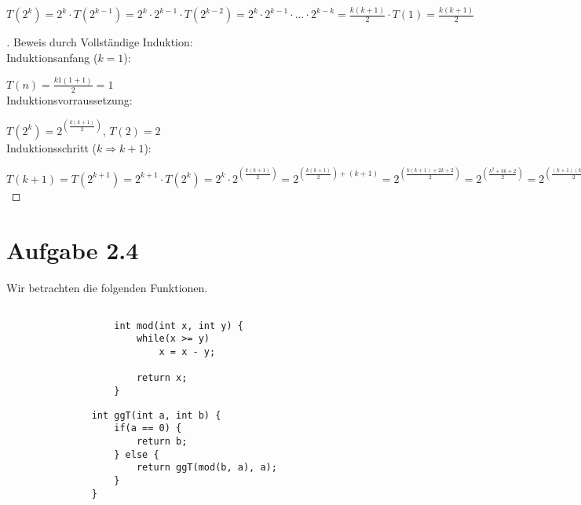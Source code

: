 \documentclass[a4paper]{article}
\begin{document}
$T\left(2^k\right) = 2^k \cdot T\left(2^{k-1}\right) = 2^k \cdot 2^{k - 1} \cdot T\left(2^{k - 2}\right) = 2^k \cdot 2^{k - 1} \cdot ... \cdot 2^{k - k} = \frac{k(k + 1)}{2} \cdot T(1) = \frac{k(k + 1)}{2}$

\begin{proof}[\unskip\nopunct]
Beweis durch Vollständige Induktion:\\

Induktionsanfang ($k = 1$):

$T(n) = \frac{k1(1 + 1)}{2} = 1$\\

Induktionsvorraussetzung:

$T(2^k) = 2^{\left(\frac{k(k + 1)}{2}\right)}$, $T(2) = 2$\\

Induktionsschritt ($k \Rightarrow k + 1$):

$T(k + 1) = T\left(2^{k + 1}\right) = 2^{k + 1} \cdot T(2^k) = 2^k \cdot 2^{\left(\frac{k(k + 1)}{2}\right)} = 2^{\left(\frac{k(k + 1)}{2}\right) + (k + 1)} = 2^{\left(\frac{k(k + 1) + 2k + 2}{2}\right)} = 2^{\left(\frac{k^2 + 3k + 2}{2}\right)} = 2^{\left(\frac{(k + 1)(k + 2)}{2}\right)}$

\end{proof}



\break
\section*{Aufgabe 2.4}
Wir betrachten die folgenden Funktionen.
\begin{figure}[H]  %
  \begin{subfigure}[b]{0.4\textwidth}
    \begin{verbatim}
    
        int mod(int x, int y) {
            while(x >= y)
                x = x - y;

            return x;
        }

    \end{verbatim}
  \end{subfigure}
  \hfill
  \begin{subfigure}[b]{0.4\textwidth}
    \begin{verbatim}
    int ggT(int a, int b) {
        if(a == 0) {
            return b;
        } else {
            return ggT(mod(b, a), a);
        }
    }
    \end{verbatim}
  \end{subfigure}
\end{figure}
\end{document}
